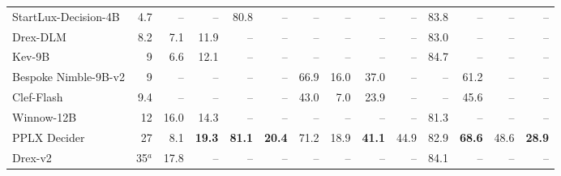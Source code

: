 \begin{table}[t]
\begin{tabular}{@{}l r rrrr rrrr rrrr@{}}
\quad StartLux-Decision-4B & 4.7 & \textcolor{black!30}{--} & \textcolor{black!30}{--} & 80.8 & \textcolor{black!30}{--} & \textcolor{black!30}{--} & \textcolor{black!30}{--} & \textcolor{black!30}{--} & \textcolor{black!30}{--} & 83.8 & \textcolor{black!30}{--} & \textcolor{black!30}{--} & \textcolor{black!30}{--}\\
\quad Drex-DLM & 8.2 & 7.1\rlap{$^\dagger$} & 11.9 & \textcolor{black!30}{--} & \textcolor{black!30}{--} & \textcolor{black!30}{--} & \textcolor{black!30}{--} & \textcolor{black!30}{--} & \textcolor{black!30}{--} & 83.0 & \textcolor{black!30}{--} & \textcolor{black!30}{--} & \textcolor{black!30}{--}\\
\quad Kev-9B & 9 & 6.6\rlap{$^\dagger$} & 12.1 & \textcolor{black!30}{--} & \textcolor{black!30}{--} & \textcolor{black!30}{--} & \textcolor{black!30}{--} & \textcolor{black!30}{--} & \textcolor{black!30}{--} & 84.7 & \textcolor{black!30}{--} & \textcolor{black!30}{--} & \textcolor{black!30}{--}\\
\quad Bespoke Nimble-9B-v2 & 9 & \textcolor{black!30}{--} & \textcolor{black!30}{--} & \textcolor{black!30}{--} & \textcolor{black!30}{--} & 66.9 & 16.0 & 37.0 & \textcolor{black!30}{--} & \textcolor{black!30}{--} & 61.2 & \textcolor{black!30}{--} & \textcolor{black!30}{--}\\
\quad Clef-Flash & 9.4 & \textcolor{black!30}{--} & \textcolor{black!30}{--} & \textcolor{black!30}{--} & \textcolor{black!30}{--} & 43.0 & 7.0 & 23.9 & \textcolor{black!30}{--} & \textcolor{black!30}{--} & 45.6 & \textcolor{black!30}{--} & \textcolor{black!30}{--}\\
\quad Winnow-12B & 12 & 16.0\rlap{$^\dagger$} & 14.3\rlap{$^\dagger$} & \textcolor{black!30}{--} & \textcolor{black!30}{--} & \textcolor{black!30}{--} & \textcolor{black!30}{--} & \textcolor{black!30}{--} & \textcolor{black!30}{--} & 81.3 & \textcolor{black!30}{--} & \textcolor{black!30}{--} & \textcolor{black!30}{--}\\
\quad PPLX Decider & 27 & 8.1\rlap{$^\dagger$} & \textbf{19.3} & \textbf{81.1} & \textbf{20.4} & 71.2 & 18.9 & \textbf{41.1} & 44.9 & 82.9 & \textbf{68.6} & 48.6 & \textbf{28.9}\\
\quad Drex-v2 & 35$^a$ & 17.8\rlap{$^\dagger$} & \textcolor{black!30}{--} & \textcolor{black!30}{--} & \textcolor{black!30}{--} & \textcolor{black!30}{--} & \textcolor{black!30}{--} & \textcolor{black!30}{--} & \textcolor{black!30}{--} & 84.1 & \textcolor{black!30}{--} & \textcolor{black!30}{--} & \textcolor{black!30}{--}\\

\end{tabular}
\end{table}
